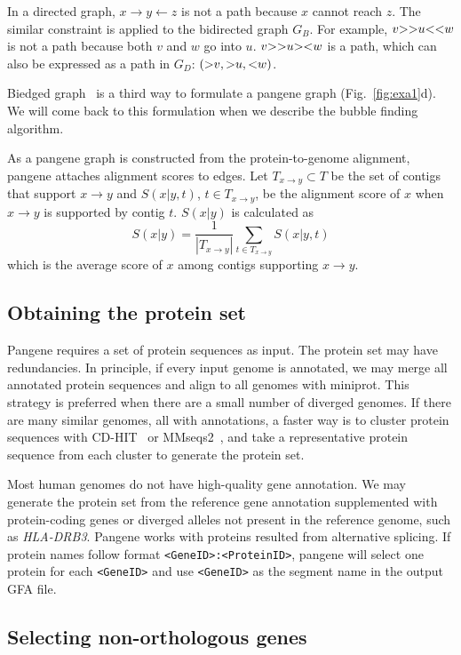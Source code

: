 \documentclass[webpdf,contemporary,large,namedate]{oup-authoring-template}%
\begin{document}
In a directed graph, $x\to y\gets z$ is not a path because $x$ cannot reach $z$.
The similar constraint is applied to the bidirected graph $G_B$.
For example, $v{\rm >>}u{\rm <<}w$ is not a path because both $v$ and $w$ go into $u$.
$v{\rm >>}u{\rm ><}w$ is a path, which can also be expressed as a path in $G_D$: $({\rm >}v,{\rm >}u,{\rm <}w)$.

Biedged graph~\citep{Paten:2018aa} is a third way to formulate a pangene graph (Fig.~\ref{fig:exa1}d).
We will come back to this formulation when we describe the bubble finding algorithm.

As a pangene graph is constructed from the protein-to-genome alignment,
pangene attaches alignment scores to edges.
Let $T_{x\to y}\subset T$ be the set of contigs that support $x\to y$
and $S(x|y,t)$, $t\in T_{x\to y}$, be the alignment score of $x$ when $x\to y$ is supported by contig $t$.
$S(x|y)$ is calculated as
$$
S(x|y)=\frac{1}{|T_{x\to y}|}\sum_{t\in T_{x\to y}}S(x|y,t)
$$
which is the average score of $x$ among contigs supporting $x\to y$.

\subsection{Obtaining the protein set}

Pangene requires a set of protein sequences as input.
The protein set may have redundancies.
In principle, if every input genome is annotated, we may merge all annotated protein sequences
and align to all genomes with miniprot.
This strategy is preferred when there are a small number of diverged genomes.
If there are many similar genomes, all with annotations,
a faster way is to cluster protein sequences with CD-HIT~\citep{Li:2006aa} or MMseqs2~\citep{Schneider:2017aa},
and take a representative protein sequence from each cluster to generate the protein set.

Most human genomes do not have high-quality gene annotation.
We may generate the protein set from the reference gene annotation supplemented
with protein-coding genes or diverged alleles not present in the reference genome, such as \emph{HLA-DRB3}.
Pangene works with proteins resulted from alternative splicing.
If protein names follow format {\tt <GeneID>:<ProteinID>},
pangene will select one protein for each {\tt <GeneID>} and use {\tt <GeneID>} as the segment name in the output GFA file.

\subsection{Selecting non-orthologous genes}
\end{document}
